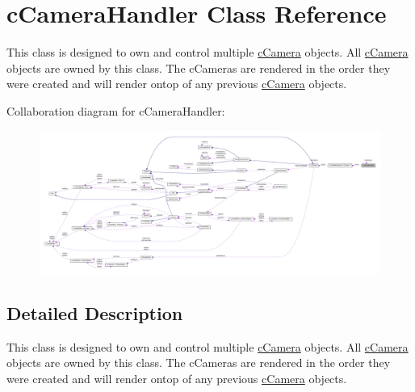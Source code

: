 \hypertarget{classc_camera_handler}{
\section{cCameraHandler Class Reference}
\label{classc_camera_handler}
}


This class is designed to own and control multiple \hyperlink{classc_camera}{cCamera} objects. All \hyperlink{classc_camera}{cCamera} objects are owned by this class. The cCameras are rendered in the order they were created and will render ontop of any previous \hyperlink{classc_camera}{cCamera} objects.  




Collaboration diagram for cCameraHandler:\nopagebreak
\begin{figure}[H]
\begin{center}
\leavevmode
\includegraphics[width=400pt]{classc_camera_handler__coll__graph}
\end{center}
\end{figure}


\subsection{Detailed Description}
This class is designed to own and control multiple \hyperlink{classc_camera}{cCamera} objects. All \hyperlink{classc_camera}{cCamera} objects are owned by this class. The cCameras are rendered in the order they were created and will render ontop of any previous \hyperlink{classc_camera}{cCamera} objects. 